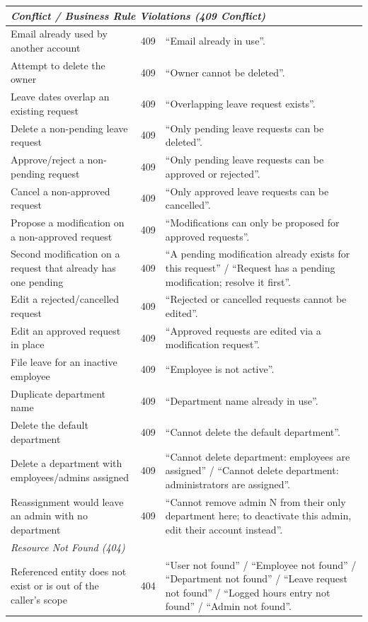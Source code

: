 \documentclass[11pt,a4paper]{article}
\begin{document}
\begin{longtable}{p{6cm} p{1.5cm} p{6cm}}
\midrule
\multicolumn{3}{l}{\textit{Conflict / Business Rule Violations (409 Conflict)}} \\
\midrule
Email already used by another account & 409 & ``Email already in use''. \\
Attempt to delete the owner & 409 & ``Owner cannot be deleted''. \\
Leave dates overlap an existing request & 409 & ``Overlapping leave request exists''. \\
Delete a non-pending leave request & 409 & ``Only pending leave requests can be deleted''. \\
Approve/reject a non-pending request & 409 & ``Only pending leave requests can be approved or rejected''. \\
Cancel a non-approved request & 409 & ``Only approved leave requests can be cancelled''. \\
Propose a modification on a non-approved request & 409 & ``Modifications can only be proposed for approved requests''. \\
Second modification on a request that already has one pending & 409 & ``A pending modification already exists for this request'' / ``Request has a pending modification; resolve it first''. \\
Edit a rejected/cancelled request & 409 & ``Rejected or cancelled requests cannot be edited''. \\
Edit an approved request in place & 409 & ``Approved requests are edited via a modification request''. \\
File leave for an inactive employee & 409 & ``Employee is not active''. \\
Duplicate department name & 409 & ``Department name already in use''. \\
Delete the default department & 409 & ``Cannot delete the default department''. \\
Delete a department with employees/admins assigned & 409 & ``Cannot delete department: employees are assigned'' / ``Cannot delete department: administrators are assigned''. \\
Reassignment would leave an admin with no department & 409 & ``Cannot remove admin N from their only department here; to deactivate this admin, edit their account instead''. \\
\midrule
\multicolumn{3}{l}{\textit{Resource Not Found (404)}} \\
\midrule
Referenced entity does not exist or is out of the caller's scope & 404 & ``User not found'' / ``Employee not found'' / ``Department not found'' / ``Leave request not found'' / ``Logged hours entry not found'' / ``Admin not found''. \\

\end{longtable}
\end{document}
